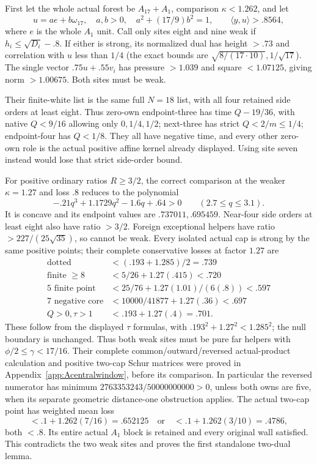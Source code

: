 \documentclass[11pt]{article}
\theoremstyle{definition}
\theoremstyle{remark}
\newcommand{\ip}[2]{\langle #1,#2\rangle}
\begin{document}
First let the whole actual forest be \(A_{17}+A_1\), comparison
\(\kappa<1.262\), and let
\[
 u=a e+b\omega_{17},\quad a,b>0,\quad
 a^2+(17/9)b^2=1,\qquad \ip yu>.8564 ,
\]
where \(e\) is the whole \(A_1\) unit.
Call only sites eight and nine weak if
\(h_i\leq\sqrt{D_i}-.8\).
If either is strong, its normalized dual has height \(>.73\)
and correlation with \(u\) less than \(1/4\)
(the exact bounds are \(\sqrt{8/(17\cdot10)},1/\sqrt{17}\)).
The single vector \(.75u+.55v_i\) has pressure \(>1.039\)
and square \(<1.07125\), giving norm \(>1.00675\).
Both sites must be weak.

Their finite-white list is the same full \(N=18\) list,
with all four retained side orders at least eight.
Thus zero-own endpoint-three has time \(Q-19/36\),
with native \(Q<9/16\) allowing only \(0,1/4,1/2\);
next-three has strict \(Q<2/m\leq1/4\);
endpoint-four has \(Q<1/8\).
They all have negative time, and every other zero-own role is
the actual positive affine kernel already displayed.
Using site seven instead would lose that strict side-order bound.

For positive ordinary ratios \(R\geq3/2\), the correct
comparison at the weaker \(\kappa=1.27\) and loss \(.8\)
reduces to the polynomial
\[
 -.21q^3+1.1729q^2-1.6q+.64>0
 \qquad(2.7\leq q\leq3.1).
\]
It is concave and its endpoint values are \(.737011,.695459\).
Near-four side orders at least eight also have ratio \(>3/2\).
Foreign exceptional helpers have ratio
\(>227/(25\sqrt{35})\), so cannot be weak.
Every isolated actual cap is strong by the same positive points;
their complete conservative losses at factor \(1.27\) are
\[
\begin{array}{c|c}
\text{dotted}&<(.193+1.285)/2=.739\\
\text{finite }\geq8&<5/26+1.27(.415)<.720\\
5\text{ finite point}&<25/76+1.27(1.01)/(6(.8))<.597\\
7\text{ negative core}&<10000/41877+1.27(.36)<.697\\
Q>0,\tau>1&<.193+1.27(.4)=.701 .
\end{array}
\]
These follow from the displayed \(\tau\) formulas, with
\(.193^2+1.27^2<1.285^2\);
the null boundary is unchanged.
Thus both weak sites must be pure far helpers with
\(\phi/2\leq\gamma<17/16\).
Their complete common/outward/reversed actual-product calculation
and positive two-cap Schur matrices were proved in
Appendix~\ref{app:Acentralwindow}, before its comparison.
In particular the reversed numerator has minimum
\(2763353243/50000000000>0\), unless both owns are five,
when its separate geometric distance-one obstruction applies.
The actual two-cap point has weighted mean loss
\[
 <.1+1.262(7/16)=.652125
 \quad\text{or}\quad <.1+1.262(3/10)=.4786,
\]
both \(<.8\).
Its entire actual \(A_1\) block is retained and every original wall
satisfied. This contradicts the two weak sites and proves the first
standalone two-dual lemma.
\end{document}
